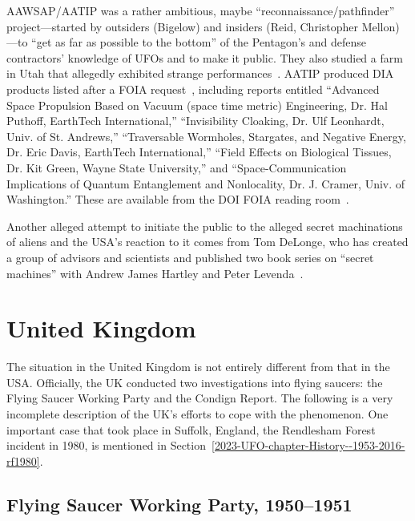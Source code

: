AAWSAP/AATIP was a rather ambitious, maybe ``reconnaissance/pathfinder'' project---started by outsiders (Bigelow) and insiders (Reid, Christopher Mellon)---to ``get as far as possible to the bottom'' of the Pentagon's and defense contractors' knowledge of UFOs and to make it public. They also studied a farm in Utah that allegedly exhibited strange performances~\cite{Lacatski-2021}. AATIP produced DIA products listed after a FOIA request~\cite{FOIA-AATIP-2019Jan}, including reports entitled ``Advanced Space Propulsion Based on Vacuum (space time metric) Engineering, Dr. Hal Puthoff, EarthTech International,'' ``Invisibility Cloaking, Dr. Ulf Leonhardt, Univ. of St. Andrews,'' ``Traversable Wormholes, Stargates, and Negative Energy, Dr. Eric Davis, EarthTech International,'' ``Field Effects on Biological Tissues, Dr. Kit Green, Wayne State University,'' and ``Space-Communication Implications of Quantum Entanglement and Nonlocality, Dr. J. Cramer, Univ. of Washington.'' These are available from the DOI FOIA reading room~\cite{DOI-FRR2023Jan}.

Another alleged attempt to initiate the public to the alleged secret machinations of aliens and the USA's reaction to it comes from Tom DeLonge,
who has created a group of advisors and scientists and published two book series on ``secret machines'' with Andrew James Hartley and Peter Levenda~\cite{DeLongeHartley-SM1,DeLongeLevenda-Gods,DeLongeHartley-SM2,DeLongeLevenda-Men}.


\section{United Kingdom}
\label{2023-UFO-part-Perception-types-UK}


The situation in the United Kingdom is not entirely different from that in the USA. Officially, the UK conducted two investigations into flying saucers: the Flying Saucer Working Party and the Condign Report. The following is a very incomplete description of the UK's efforts to cope with the phenomenon. One important case that took place in Suffolk, England, the Rendlesham Forest incident in 1980, is mentioned in Section~\ref{2023-UFO-chapter-History--1953-2016-rf1980}.


\subsection{Flying Saucer Working Party, 1950--1951}
\label{2023-UFO-part-Perception-types-UK-flwp1950-1}

